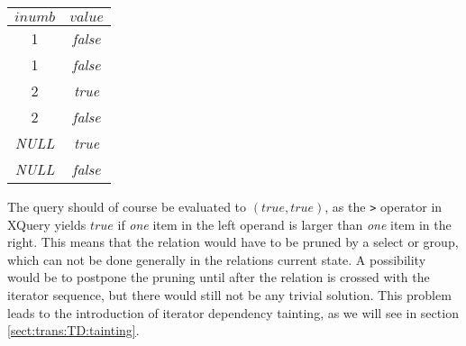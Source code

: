 \begin{figure*}[!h]
\centering
\begin{tabular}{|c|c|} \hline
$inumb$ & $value$ \\\hline
1 & \textit{false} \\\hline
1 & \textit{false} \\\hline
2 & \textit{true} \\\hline
2 & \textit{false} \\\hline
\textit{NULL} & \textit{true} \\\hline
\textit{NULL} & \textit{false} \\\hline
\end{tabular}
\end{figure*}

The query should of course be evaluated to $(true, true)$, as the \texttt{>} operator in XQuery yields $true$ if
\textit{one} item in the left operand is larger than \textit{one} item in the right.
This means that the relation would have to be pruned by a \textsf{select} or \textsf{group}, which can not be done
generally in the relations current state. A possibility would be to postpone the pruning until after the relation
is crossed with the iterator sequence, but there would still not be any trivial
solution. This problem leads to the introduction of iterator dependency
tainting, as we will see in section \ref{sect:trans:TD:tainting}.
